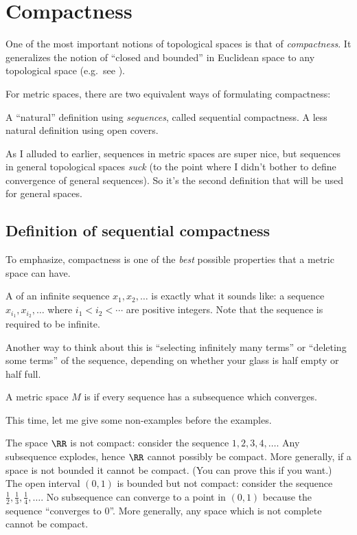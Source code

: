 \chapter{Compactness}
\label{ch:compactness}
One of the most important notions of topological spaces is that of \emph{compactness}.
It generalizes the notion of ``closed and bounded'' in Euclidean space
to any topological space
(e.g.\ see ).

For metric spaces, there are two equivalent ways of formulating compactness:
\begin{itemize}
	\ii A ``natural'' definition using \emph{sequences}, called sequential compactness.
	\ii A less natural definition using open covers.
\end{itemize}
As I alluded to earlier, sequences in metric spaces are super nice,
but sequences in general topological spaces \emph{suck} (to the point where
I didn't bother to define convergence of general sequences).
So it's the second definition that will be used for general spaces.

\section{Definition of sequential compactness}
To emphasize, compactness is one of the
\emph{best} possible properties that a metric space can have.
\begin{definition}
	A  of an infinite sequence
	$x_1, x_2, \dots$ is exactly what it sounds like:
	a sequence $x_{i_1}, x_{i_2}, \dots$
	where $i_1 < i_2 < \cdots$ are positive integers.
	Note that the sequence is required to be infinite.
\end{definition}
Another way to think about this is ``selecting infinitely many terms''
or ``deleting some terms'' of the sequence, depending on whether
your glass is half empty or half full.

\begin{definition}
	A metric space $M$ is  if
	every sequence has a subsequence which converges.
\end{definition}
This time, let me give some non-examples before the examples.
\begin{example}
	\listhack
	\begin{enumerate}[(a)]
		\ii The space $\RR$ is not compact: consider the sequence $1,2,3,4,\dots$.
		Any subsequence explodes, hence $\RR$ cannot possibly be compact.
		\ii More generally, if a space is
		not bounded it cannot be compact.
		(You can prove this if you want.)
		\ii The open interval $(0,1)$ is bounded but not compact:
		consider the sequence $\frac12, \frac13, \frac14, \dots$.
		No subsequence can converge to a point in $(0,1)$ because the sequence ``converges to $0$''.
		\ii More generally, any space which is not complete cannot be compact.
	\end{enumerate}
\end{example}

